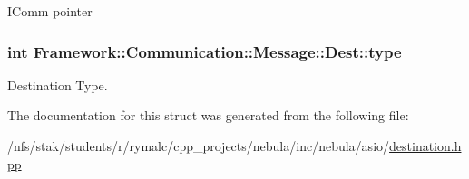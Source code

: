 IComm pointer \hypertarget{structFramework_1_1Communication_1_1Message_1_1Dest_ac1ec4f8071c73e984673138423c6918f}{
\subsubsection[{type}]{\setlength{\rightskip}{0pt plus 5cm}int {\bf Framework::Communication::Message::Dest::type}}}
\label{structFramework_1_1Communication_1_1Message_1_1Dest_ac1ec4f8071c73e984673138423c6918f}


Destination Type. 

The documentation for this struct was generated from the following file:\begin{DoxyCompactItemize}
\item 
/nfs/stak/students/r/rymalc/cpp\_\-projects/nebula/inc/nebula/asio/\hyperlink{destination_8hpp}{destination.hpp}\end{DoxyCompactItemize}
